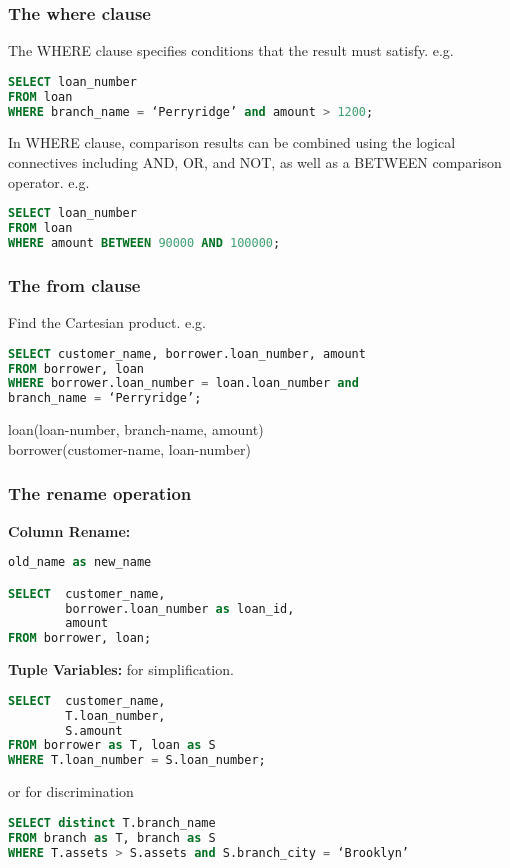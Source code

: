 \subsubsection{The where clause}
The WHERE clause specifies conditions that the result must satisfy. e.g. 
\begin{lstlisting}[language=sql]
SELECT loan_number
FROM loan
WHERE branch_name = ‘Perryridge’ and amount > 1200;
\end{lstlisting}

In WHERE clause, comparison results can be combined using the
logical connectives including AND, OR, and NOT, as well as a BETWEEN comparison operator. e.g.
\begin{lstlisting}[language=sql]
SELECT loan_number
FROM loan
WHERE amount BETWEEN 90000 AND 100000;
\end{lstlisting}

\subsubsection{The from clause}
Find the Cartesian product. e.g. 
\begin{lstlisting}[language=sql]
SELECT customer_name, borrower.loan_number, amount
FROM borrower, loan
WHERE borrower.loan_number = loan.loan_number and
branch_name = ‘Perryridge’;
\end{lstlisting}
loan(loan-number, branch-name, amount)\\
borrower(customer-name, loan-number)


\subsubsection{The rename operation}
\textbf{Column Rename: }
\begin{lstlisting}[language=sql]
old_name as new_name

SELECT  customer_name, 
        borrower.loan_number as loan_id, 
        amount
FROM borrower, loan;
\end{lstlisting}

\textbf{Tuple Variables: }for simplification. 
\begin{lstlisting}[language=sql]
SELECT  customer_name, 
        T.loan_number, 
        S.amount
FROM borrower as T, loan as S
WHERE T.loan_number = S.loan_number;
\end{lstlisting}

or for discrimination
\begin{lstlisting}[language=sql]
SELECT distinct T.branch_name
FROM branch as T, branch as S
WHERE T.assets > S.assets and S.branch_city = ‘Brooklyn’
\end{lstlisting}

